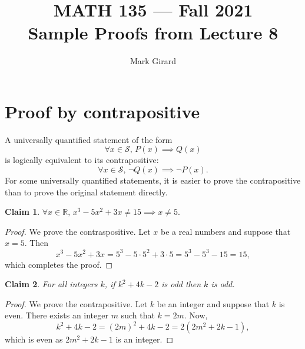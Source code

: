 \documentclass[11pt]{article}
\theoremstyle{plain}
\newtheorem*{claim}{Claim}
\theoremstyle{plain}
\theoremstyle{remark}
\def\reals{\mathbb{R}}
\begin{document}
\title{MATH 135 --- Fall 2021\\ Sample Proofs from Lecture 8}
\author{Mark Girard}

\maketitle

\section*{Proof by contrapositive}

A universally quantified statement of the form
\[
 \forall x\in\mathcal{S},\, P(x)\implies Q(x)
\]
is logically equivalent to its contrapositive:
\[
 \forall x\in\mathcal{S},\, \neg Q(x)\implies \neg P(x).
\]
For some universally quantified statements, it is easier to prove the contrapositive than to prove the original statement directly. 

\begin{tcolorbox}
\begin{claim}
$ \forall x\in\reals,\, x^3 - 5x^2 + 3x \neq 15 \implies x\neq 5.$
\end{claim}
\end{tcolorbox}

\begin{proof}
 We prove the contraspositive. Let $x$ be a real numbers and suppose that $x=5$. Then
 \[
  x^3 - 5x^2 + 3x = 5^3 - 5\cdot 5^2 + 3\cdot 5 = 5^3 - 5^3 - 15 = 15,
 \]
which completes the proof.
\end{proof}

\begin{tcolorbox}
\begin{claim}
 For all integers $k$, if $k^2+4k-2$ is odd then $k$ is odd.
\end{claim}
\end{tcolorbox}
\begin{proof}
 We prove the contrapositive. Let $k$ be an integer and suppose that $k$ is even. There exists an integer $m$ such that $k=2m$. Now,
 \[
  k^2+4k-2 = (2m)^2 + 4k - 2 = 2(2m^2 + 2k - 1),
 \]
which is even as $2m^2 + 2k - 1$ is an integer.
\end{proof}
\end{document}
